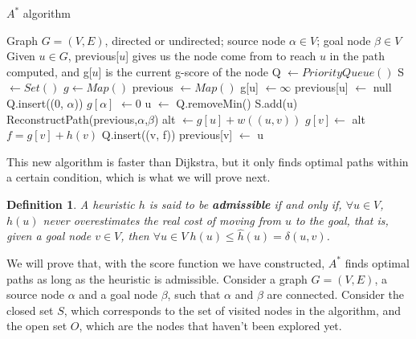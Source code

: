 \documentclass[12pt]{report}
\newtheorem{definition}[theorem]{Definition}
\begin{document}
\begin{algorithm}
\caption{$A^*$ algorithm}
\label{alg:astar}
\begin{algorithmic}[1]
\Require Graph $G = (V, E)$, directed or undirected; source node $\alpha \in V$; goal node $\beta \in V$
\Ensure Given $u \in G$, previous[$u$] gives us the node come from to reach $u$ in the path computed, and g[$u$] is the current g-score of the node
\State Q $\gets PriorityQueue()$
\State S $\gets Set()$
\State $ g \gets Map()$
\State previous $\gets Map()$
	\State g[u] $\gets \infty$
	\State previous[u] $\gets$ null
\EndFor
\State Q.insert((0, $\alpha$))
\State $g[\alpha]$ $\gets 0$
	\State u $\gets$ Q.removeMin()
	\State S.add(u)
	 
		\State \Return ReconstructPath(previous,$\alpha$,$\beta$)
	\EndIf
			\Continue {}
		\EndIf
		\State alt $\gets g[u] + w((u, v))$
			\State $g[v] \gets$ alt 
			\State $f = g[v] + h(v)$
			\State Q.insert((v, f))
			\State previous[v] $\gets$ u
		\EndIf
	\EndFor
\EndWhile
\EndProcedure
\end{algorithmic}
\end{algorithm}

This new algorithm is faster than Dijkstra, but it only finds optimal paths within a certain condition, which is what we will prove next.

\begin{definition}
A heuristic $h$ is said to be \textbf{admissible} if and only if, $\forall u \in V$, $h(u)$ never overestimates the real cost of moving from $u$ to the goal, that is, given a goal node $v \in V$, then $\forall u \in V \ h(u) \le \hat{h}(u) = \delta(u, v)$.
\end{definition}

We will prove that, with the score function we have constructed, $A^*$ finds optimal paths as long as the heuristic is admissible. Consider a graph $G = (V, E)$, a source node $\alpha$ and a goal node $\beta$, such that $\alpha$ and $\beta$ are connected. Consider the closed set $S$, which corresponds to the set of visited nodes in the algorithm, and the open set $O$, which are the nodes that haven't been explored yet.
\end{document}

